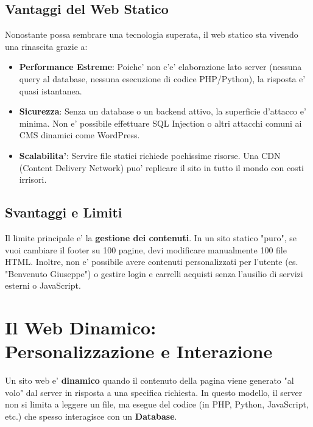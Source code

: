 \documentclass[11pt,a4paper]{report}
\begin{document}
\subsection{Vantaggi del Web Statico}
Nonostante possa sembrare una tecnologia superata, il web statico sta vivendo una rinascita grazie a:
\begin{itemize}
    \item \textbf{Performance Estreme}: Poiche' non c'e' elaborazione lato server (nessuna query al database, nessuna esecuzione di codice PHP/Python), la risposta e' quasi istantanea.
    \item \textbf{Sicurezza}: Senza un database o un backend attivo, la superficie d'attacco e' minima. Non e' possibile effettuare SQL Injection o altri attacchi comuni ai CMS dinamici come WordPress.
    \item \textbf{Scalabilita'}: Servire file statici richiede pochissime risorse. Una CDN (Content Delivery Network) puo' replicare il sito in tutto il mondo con costi irrisori.
\end{itemize}

\subsection{Svantaggi e Limiti}
Il limite principale e' la \textbf{gestione dei contenuti}. In un sito statico "puro", se vuoi cambiare il footer su 100 pagine, devi modificare manualmente 100 file HTML. Inoltre, non e' possibile avere contenuti personalizzati per l'utente (es. "Benvenuto Giuseppe") o gestire login e carrelli acquisti senza l'ausilio di servizi esterni o JavaScript.

\section{Il Web Dinamico: Personalizzazione e Interazione}
Un sito web e' \textbf{dinamico} quando il contenuto della pagina viene generato "al volo" dal server in risposta a una specifica richiesta. In questo modello, il server non si limita a leggere un file, ma esegue del codice (in PHP, Python, JavaScript, etc.) che spesso interagisce con un \textbf{Database}.
\end{document}
